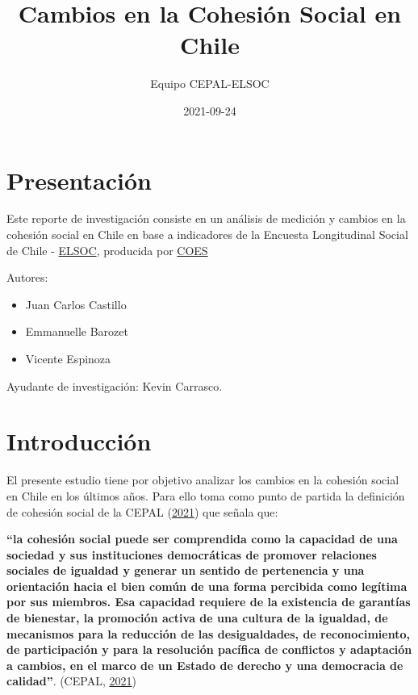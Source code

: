 \documentclass[
  12pt,
]{book}
\title{Cambios en la Cohesión Social en Chile}
\author{Equipo CEPAL-ELSOC}
\date{2021-09-24}
\providecommand{\tightlist}{%
  \setlength{\itemsep}{0pt}\setlength{\parskip}{0pt}}
\begin{document}
\maketitle

{
\hypersetup{linkcolor=}
\setcounter{tocdepth}{1}
\tableofcontents
}
\listoftables
\listoffigures
{}
\hypertarget{presentaciuxf3n}{%
\chapter*{Presentación}\label{presentaciuxf3n}}

Este reporte de investigación consiste en un análisis de medición y cambios en la cohesión social en Chile en base a indicadores de la Encuesta Longitudinal Social de Chile - \href{https://coes.cl/encuesta-panel/}{ELSOC}, producida por \href{https://coes.cl/}{COES}

Autores:

\begin{itemize}
\tightlist
\item
  Juan Carlos Castillo
\item
  Emmanuelle Barozet
\item
  Vicente Espinoza
\end{itemize}

Ayudante de investigación: Kevin Carrasco.

\hypertarget{introducciuxf3n}{%
\chapter*{Introducción}\label{introducciuxf3n}}

El presente estudio tiene por objetivo analizar los cambios en la cohesión social en Chile en los últimos años. Para ello toma como punto de partida la definición de cohesión social de la CEPAL (\protect\hyperlink{ref-cepal_cohesion_2021}{2021}) que señala que:

\textbf{``la cohesión social puede ser comprendida como la capacidad de una sociedad y sus instituciones democráticas de promover relaciones sociales de igualdad y generar un sentido de pertenencia y una orientación hacia el bien común de una forma percibida como legítima por sus miembros. Esa capacidad requiere de la existencia de garantías de bienestar, la promoción activa de una cultura de la igualdad, de mecanismos para la reducción de las desigualdades, de reconocimiento, de participación y para la resolución pacífica de conflictos y adaptación a cambios, en el marco de un Estado de derecho y una democracia de calidad''}. (CEPAL, \protect\hyperlink{ref-cepal_cohesion_2021}{2021})
\end{document}
